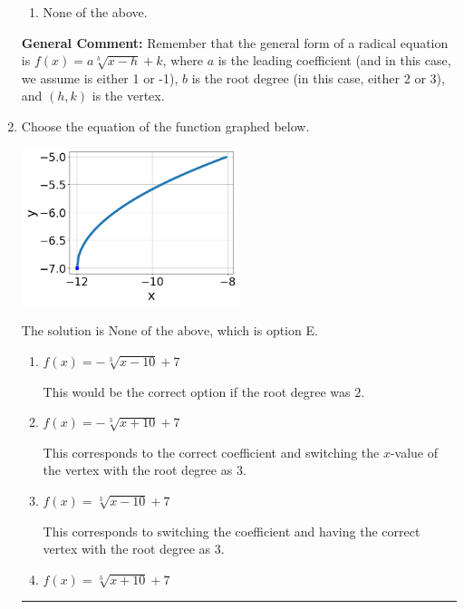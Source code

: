 \documentclass{extbook}[14pt]
\newcommand{\litem}[1]{\item #1

\rule{\textwidth}{0.4pt}}
\begin{document}
\begin{enumerate}
{\begin{enumerate}[label=\Alph*.]
\item None of the above.\end{enumerate}
\textbf{General Comment:} Remember that the general form of a radical equation is $ f(x) = a \sqrt[b]{x - h} + k $, where $a$ is the leading coefficient (and in this case, we assume is either 1 or -1), $b$ is the root degree (in this case, either 2 or 3), and $(h, k)$ is the vertex.
}
\litem{
Choose the equation of the function graphed below.

\begin{center}
    \includegraphics[width=0.5\textwidth]{../Figures/radicalGraphToEquationCopyA.png}
\end{center}


The solution is \( \text{None of the above} \), which is option E.\begin{enumerate}[label=\Alph*.]
\item \( f(x) = - \sqrt[3]{x - 10} + 7 \)

This would be the correct option if the root degree was $2$.
\item \( f(x) = - \sqrt[3]{x + 10} + 7 \)

This corresponds to the correct coefficient and switching the $x$-value of the vertex with the root degree as $3$.
\item \( f(x) = \sqrt[3]{x - 10} + 7 \)

This corresponds to switching the coefficient and having the correct vertex with the root degree as $3$.
\item \( f(x) = \sqrt[3]{x + 10} + 7 \)


\end{enumerate}}
\end{enumerate}
\end{document}
